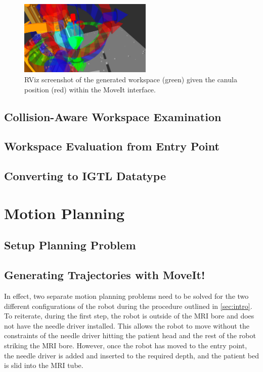 \documentclass[12pt]{report}
\begin{document}
\begin{figure}[thpb]
	\centering
	\includegraphics[width = 2.5in]{images/workspace_v1.png}
    \caption{RViz screenshot of the generated workspace (green) given the canula position (red) within the MoveIt interface.}
    \label{fig:workspaceAct}
\end{figure}

\section{Collision-Aware Workspace Examination}

\section{Workspace Evaluation from Entry Point}

\section{Converting to IGTL Datatype}

\chapter{Motion Planning}
\section{Setup Planning Problem}

\section{Generating Trajectories with MoveIt!}
In effect, two separate motion planning problems need to be solved for the two different configurations of the robot during the procedure outlined in \autoref{sec:intro}. To reiterate, during the first step, the robot is outside of the MRI bore and does not have the needle driver installed. This allows the robot to move without the constraints of the needle driver hitting the patient head and the rest of the robot striking the MRI bore. However, once the robot has moved to the entry point, the needle driver is added and inserted to the required depth, and the patient bed is slid into the MRI tube.
\end{document}
